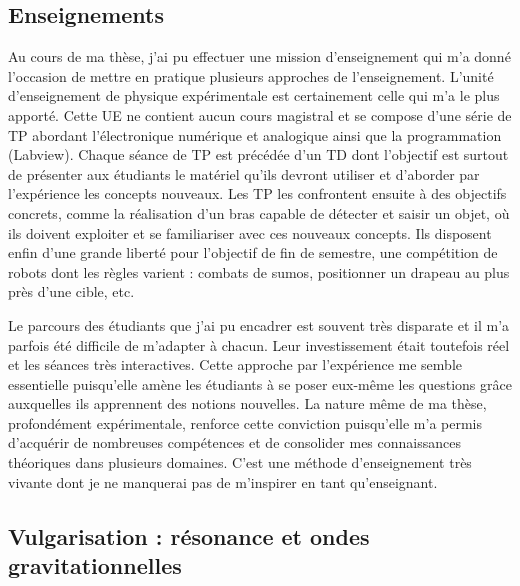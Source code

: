 \documentclass[12pt,a4paper]{article}
\begin{document}
\subsection{Enseignements}

Au cours de ma thèse, j'ai pu effectuer une mission d'enseignement qui m'a donné l'occasion de mettre en pratique plusieurs approches de l'enseignement.
L'unité d'enseignement de physique expérimentale est certainement celle qui m'a le plus apporté.
Cette UE ne contient aucun cours magistral et se compose d'une série de TP abordant l'électronique numérique et analogique ainsi que la programmation (Labview).
Chaque séance de TP est précédée d'un TD dont l'objectif est surtout de présenter aux étudiants le matériel qu'ils devront utiliser et d'aborder par l'expérience les concepts nouveaux.
Les TP les confrontent ensuite à des objectifs concrets, comme la réalisation d'un bras capable de détecter et saisir un objet, où ils doivent exploiter et se familiariser avec ces nouveaux concepts.
Ils disposent enfin d'une grande liberté pour l'objectif de fin de semestre, une compétition de robots dont les règles varient : combats de \og sumos\fg{}, positionner un drapeau au plus près d'une cible, etc.

Le parcours des étudiants que j'ai pu encadrer est souvent très disparate et il m'a parfois été difficile de m'adapter à chacun.
Leur investissement était toutefois réel et les séances très interactives.
Cette approche par l'expérience me semble essentielle puisqu'elle amène les étudiants à se poser eux-même les questions grâce auxquelles ils apprennent des notions nouvelles.
La nature même de ma thèse, profondément expérimentale, renforce cette conviction puisqu'elle m'a permis d'acquérir de nombreuses compétences et de consolider mes connaissances théoriques dans plusieurs domaines.
C'est une méthode d'enseignement très vivante dont je ne manquerai pas de m'inspirer en tant qu'enseignant.

\subsection{Vulgarisation : résonance et ondes gravitationnelles}
\end{document}
